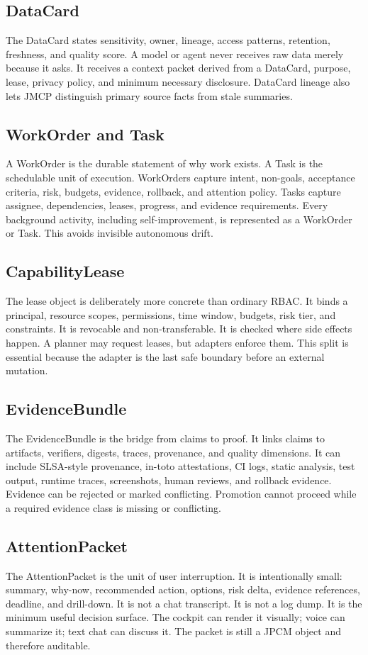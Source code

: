 \documentclass[10pt,journal,onecolumn]{IEEEtran}
\begin{document}
\subsection{DataCard}
The DataCard states sensitivity, owner, lineage, access patterns, retention, freshness, and quality score. A model or agent never receives raw data merely because it asks. It receives a context packet derived from a DataCard, purpose, lease, privacy policy, and minimum necessary disclosure. DataCard lineage also lets JMCP distinguish primary source facts from stale summaries.

\subsection{WorkOrder and Task}
A WorkOrder is the durable statement of why work exists. A Task is the schedulable unit of execution. WorkOrders capture intent, non-goals, acceptance criteria, risk, budgets, evidence, rollback, and attention policy. Tasks capture assignee, dependencies, leases, progress, and evidence requirements. Every background activity, including self-improvement, is represented as a WorkOrder or Task. This avoids invisible autonomous drift.

\subsection{CapabilityLease}
The lease object is deliberately more concrete than ordinary RBAC. It binds a principal, resource scopes, permissions, time window, budgets, risk tier, and constraints. It is revocable and non-transferable. It is checked where side effects happen. A planner may request leases, but adapters enforce them. This split is essential because the adapter is the last safe boundary before an external mutation.

\subsection{EvidenceBundle}
The EvidenceBundle is the bridge from claims to proof. It links claims to artifacts, verifiers, digests, traces, provenance, and quality dimensions. It can include SLSA-style provenance, in-toto attestations, CI logs, static analysis, test output, runtime traces, screenshots, human reviews, and rollback evidence. Evidence can be rejected or marked conflicting. Promotion cannot proceed while a required evidence class is missing or conflicting.

\subsection{AttentionPacket}
The AttentionPacket is the unit of user interruption. It is intentionally small: summary, why-now, recommended action, options, risk delta, evidence references, deadline, and drill-down. It is not a chat transcript. It is not a log dump. It is the minimum useful decision surface. The cockpit can render it visually; voice can summarize it; text chat can discuss it. The packet is still a JPCM object and therefore auditable.
\end{document}
